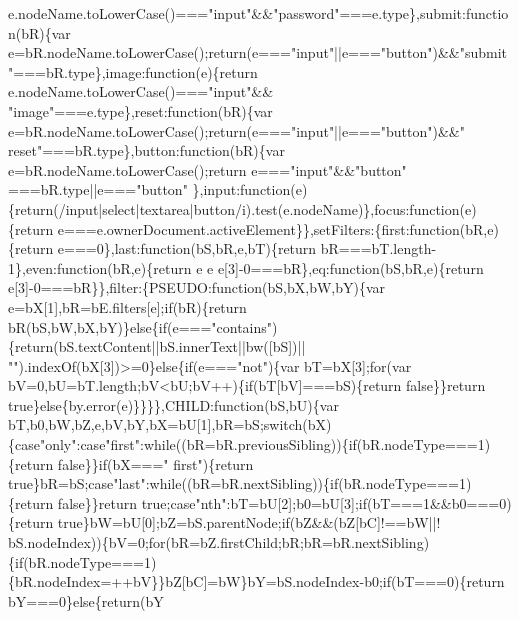 \begin{DoxyCode}
{       e.nodeName.toLowerCase()==="}input\textcolor{stringliteral}{"&&"}password\textcolor{stringliteral}{"===e.type\},submit:function(bR)\{var
       e=bR.nodeName.toLowerCase();return(e==="}input\textcolor{stringliteral}{"||e==="}button\textcolor{stringliteral}{")&&"}submit\textcolor{stringliteral}{"===bR.type\},image:function(e)\{return e.nodeName.toLowerCase()==="}input\textcolor{stringliteral}{"&&
      "}image\textcolor{stringliteral}{"===e.type\},reset:function(bR)\{var e=bR.nodeName.toLowerCase();return(e==="}input\textcolor{stringliteral}{"||e==="}button\textcolor{stringliteral}{")&&"}
      reset\textcolor{stringliteral}{"===bR.type\},button:function(bR)\{var e=bR.nodeName.toLowerCase();return e==="}input\textcolor{stringliteral}{"&&"}button\textcolor{stringliteral}{"
      ===bR.type||e==="}button\textcolor{stringliteral}{"
      \},input:function(e)\{return(/input|select|textarea|button/i).test(e.nodeName)\},focus:function(e)\{return e===e.ownerDocument.activeElement\}\},setFilters:\{first:function(bR,e)\{return
       e===0\},last:function(bS,bR,e,bT)\{return bR===bT.length-1\},even:function(bR,e)\{return e%
       e%
       e[3]-0===bR\},eq:function(bS,bR,e)\{return e[3]-0===bR\}\},filter:\{PSEUDO:function(bS,bX,bW,bY)\{var
       e=bX[1],bR=bE.filters[e];if(bR)\{return bR(bS,bW,bX,bY)\}else\{if(e==="}contains\textcolor{stringliteral}{")\{return(bS.textContent||bS.innerText||bw([bS])||
      "}\textcolor{stringliteral}{").indexOf(bX[3])>=0\}else\{if(e==="}not\textcolor{stringliteral}{")\{var bT=bX[3];for(var
       bV=0,bU=bT.length;bV<bU;bV++)\{if(bT[bV]===bS)\{return false\}\}return true\}else\{by.error(e)\}\}\}\},CHILD:function(bS,bU)\{var
       bT,b0,bW,bZ,e,bV,bY,bX=bU[1],bR=bS;switch(bX)\{case"}only\textcolor{stringliteral}{":case"}first\textcolor{stringliteral}{":while((bR=bR.previousSibling))\{if(bR.nodeType===1)\{return false\}\}if(bX==="}
      first\textcolor{stringliteral}{")\{return true\}bR=bS;case"}last\textcolor{stringliteral}{":while((bR=bR.nextSibling))\{if(bR.nodeType===1)\{return false\}\}return
       true;case"}nth\textcolor{stringliteral}{":bT=bU[2];b0=bU[3];if(bT===1&&b0===0)\{return
       true\}bW=bU[0];bZ=bS.parentNode;if(bZ&&(bZ[bC]!==bW||!
      bS.nodeIndex))\{bV=0;for(bR=bZ.firstChild;bR;bR=bR.nextSibling)\{if(bR.nodeType===1)\{bR.nodeIndex=++bV\}\}bZ[bC]=bW\}bY=bS.nodeIndex-b0;if(bT===0)\{return
       bY===0\}else\{return(bY%
}
\end{DoxyCode}
